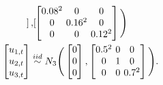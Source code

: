 \documentclass[twoside,11pt]{article}
\begin{document}
\begin{equation}
\begin{gathered}
\begin{bmatrix}
\end{bmatrix},
\begingroup %
\setlength\arraycolsep{1.8pt}
\begin{bmatrix}
0.08^2&0 & 0\\
0&0.16^2 & 0\\
0& 0 & 0.12^2
\end{bmatrix}
\endgroup\Bigg)\\
\begin{bmatrix}
u_{1,t}  \\
u_{2,t} \\
u_{3,t}
\end{bmatrix}\stackrel{iid}\sim N_3\Bigg(
\begin{bmatrix}
0  \\
0 \\
0
\end{bmatrix},
\begingroup %
\setlength\arraycolsep{1.8pt}
\begin{bmatrix}
0.5^2&0 & 0\\
0&1 & 0\\
0 & 0 & 0.7^2
\end{bmatrix}
\endgroup\Bigg).
\end{gathered}
\end{equation}
\end{document}

